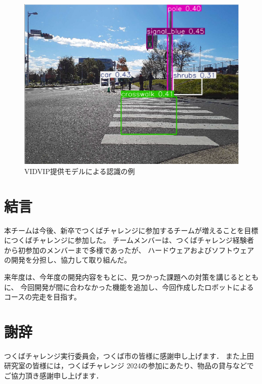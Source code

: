 \documentclass[twocolumn,9pt]{jsproceedings}
\begin{document}
\begin{figure}[h]
  \begin{center}
    \includegraphics[width=0.6\linewidth]{figs/result_of_yolo.pdf}
    \caption{VIDVIP提供モデルによる認識の例}
    \label{fig:result_yolo}
  \end{center}
\end{figure}
\section{結言}
本チームは今後、新卒でつくばチャレンジに参加するチームが増えることを目標につくばチャレンジに参加した。
チームメンバーは、つくばチャレンジ経験者から初参加のメンバーまで多様であったが、
ハードウェアおよびソフトウェアの開発を分担し、協力して取り組んだ。

来年度は、今年度の開発内容をもとに、見つかった課題への対策を講じるとともに、
今回開発が間に合わなかった機能を追加し、今回作成したロボットによるコースの完走を目指す。


\section*{謝辞}
つくばチャレンジ実行委員会，つくば市の皆様に感謝申し上げます．
また上田研究室の皆様には，つくばチャレンジ 2024の参加にあたり、物品の貸与などでご協力頂き感謝申し上げます．
\end{document}
